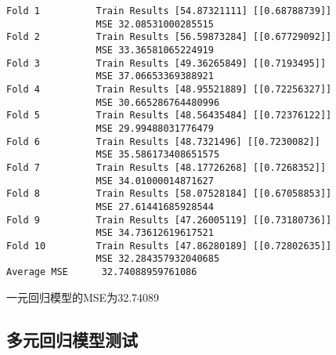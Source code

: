 \documentclass[11pt]{article}
\begin{document}
    \begin{Verbatim}[commandchars=\\\{\}]
Fold 1          Train Results [54.87321111] [[0.68788739]]
                MSE 32.08531000285515
Fold 2          Train Results [56.59873284] [[0.67729092]]
                MSE 33.36581065224919
Fold 3          Train Results [49.36265849] [[0.7193495]]
                MSE 37.06653369388921
Fold 4          Train Results [48.95521889] [[0.72256327]]
                MSE 30.665286764480996
Fold 5          Train Results [48.56435484] [[0.72376122]]
                MSE 29.99488031776479
Fold 6          Train Results [48.7321496] [[0.7230082]]
                MSE 35.586173408651575
Fold 7          Train Results [48.17726268] [[0.7268352]]
                MSE 34.01000014871627
Fold 8          Train Results [58.07528184] [[0.67058853]]
                MSE 27.61441685928544
Fold 9          Train Results [47.26005119] [[0.73180736]]
                MSE 34.73612619617521
Fold 10         Train Results [47.86280189] [[0.72802635]]
                MSE 32.284357932040685
Average MSE      32.74088959761086
    \end{Verbatim}

    一元回归模型的MSE为32.74089

\subsection{多元回归模型测试}\label{ux591aux5143ux56deux5f52ux6a21ux578bux6d4bux8bd5}
\end{document}
